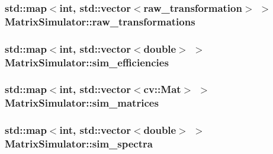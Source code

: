 \subsubsection[{\texorpdfstring{raw\+\_\+transformations}{raw_transformations}}]{\setlength{\rightskip}{0pt plus 5cm}std\+::map$<$int, std\+::vector$<${\bf raw\+\_\+transformation}$>$ $>$ Matrix\+Simulator\+::raw\+\_\+transformations\hspace{0.3cm}{\ttfamily [private]}}\hypertarget{class_matrix_simulator_a1266c67228a0fc2c1387c4e7454fe435}{}\label{class_matrix_simulator_a1266c67228a0fc2c1387c4e7454fe435}
\subsubsection[{\texorpdfstring{sim\+\_\+efficiencies}{sim_efficiencies}}]{\setlength{\rightskip}{0pt plus 5cm}std\+::map$<$int, std\+::vector$<$double$>$ $>$ Matrix\+Simulator\+::sim\+\_\+efficiencies\hspace{0.3cm}{\ttfamily [private]}}\hypertarget{class_matrix_simulator_a6202de105f6c949a226b98bb048560c1}{}\label{class_matrix_simulator_a6202de105f6c949a226b98bb048560c1}
\subsubsection[{\texorpdfstring{sim\+\_\+matrices}{sim_matrices}}]{\setlength{\rightskip}{0pt plus 5cm}std\+::map$<$int, std\+::vector$<$cv\+::\+Mat$>$ $>$ Matrix\+Simulator\+::sim\+\_\+matrices\hspace{0.3cm}{\ttfamily [private]}}\hypertarget{class_matrix_simulator_a4886dd70ef084bd73bb224c7f28897ee}{}\label{class_matrix_simulator_a4886dd70ef084bd73bb224c7f28897ee}
\subsubsection[{\texorpdfstring{sim\+\_\+spectra}{sim_spectra}}]{\setlength{\rightskip}{0pt plus 5cm}std\+::map$<$int, std\+::vector$<$double$>$ $>$ Matrix\+Simulator\+::sim\+\_\+spectra\hspace{0.3cm}{\ttfamily [private]}}\hypertarget{class_matrix_simulator_aa3ddf31246c9f2be64ab12fe4b47e8af}{}\label{class_matrix_simulator_aa3ddf31246c9f2be64ab12fe4b47e8af}
